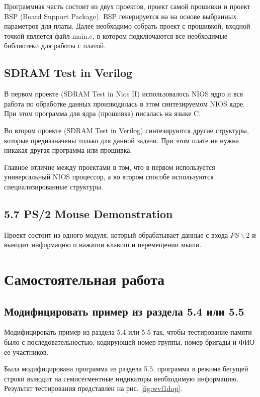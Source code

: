 \documentclass[a4paper,14pt]{article}
\begin{document}
	Программная часть состоит из двух проектов, проект самой прошивки и проект BSP (Board Support Package).
	BSP генерируется на на основе выбранных параметров для платы.
	Далее необходимо собрать проект с прошивкой, входной точкой является файл main.c, в котором подключаются все необходимые библиотеки для работы с платой.
	
	\subsection{SDRAM Test in Verilog} 
	
	В первом проекте (SDRAM Test in Nios II) использовалось NIOS ядро и вся работа по обработке данных производилась в этом синтезируемом NIOS ядре. При этом программа для ядра (прошивка) писалась на языке C.
	
	Во втором проекте (SDRAM Test in Verilog) синтезируются другие структуры, которые предназначены только для данной задачи. При этом плате не нужна никакая другая программа или прошивка. 
	
	Главное отличие между проектами в том, что в первом используется универсальный NIOS процессор, а во втором способе используются специализированные структуры.
	
	\subsection{5.7 PS/2 Mouse Demonstration} 
	
	Проект состоит из одного модуля, который обрабатывает данные с входа $PS \backslash 2$ и выводит информацию о нажатии клавиш и перемещении мыши.
	

	\section{Самостоятельная работа}
	
	\subsection{Модифицировать пример из раздела 5.4 или 5.5}
	
	Модифицировать пример из раздела 5.4 или 5.5 так, чтобы тестирование памяти было с последовательностью, кодирующей номер группы, номер бригады и ФИО ее участников.
	
	Была модифицирована программа из раздела 5.5, программа в режиме бегущей строки выводит на семисегментные индикаторы необходимую информацию. Результат тестирования представлен на рис. \ref*{fig:wvf1dop}.
	
\end{document}
